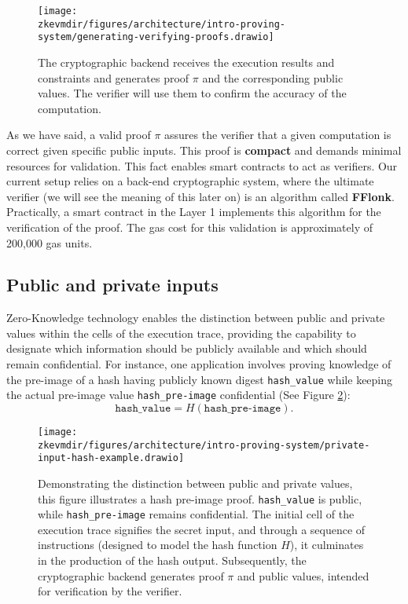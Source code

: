 \begin{figure}[h]
\centering
\texttt{[image: \\zkevmdir/figures/architecture/intro-proving-system/generating-verifying-proofs.drawio]}
\caption{The cryptographic backend receives the execution results and constraints and generates proof $\pi$ and the corresponding public values. The verifier will use them to confirm the accuracy of the computation.}
\label{fig:generating-verifying-proofs}
\end{figure}

As we have said, a valid proof $\pi$ assures the verifier that a given computation is correct given specific public inputs. This proof is \textbf{compact} and demands minimal resources for validation. This fact enables smart contracts to act as verifiers. Our current setup relies on a back-end cryptographic system, where the ultimate verifier (we will see the meaning of this later on) is an algorithm called \textbf{FFlonk}. Practically, a smart contract in the Layer 1 implements this algorithm for the verification of the proof. The gas cost for this validation is approximately of 200,000 gas units.

\subsection{Public and private inputs} \label{sec:public-private-inputs}

Zero-Knowledge technology enables the distinction between public and private values within the cells of the execution trace, providing the capability to designate which information should be publicly available and which should remain confidential. For instance, one application involves proving knowledge of the pre-image of a hash having publicly known digest \texttt{hash\_value} while keeping the actual pre-image value \texttt{hash\_pre-image} confidential (See Figure \ref{fig:private-input-hash-example}):
\[
\texttt{hash\_value} = H(\texttt{hash\_pre-image}).
\]

\begin{figure}[h]
\centering
\texttt{[image: \\zkevmdir/figures/architecture/intro-proving-system/private-input-hash-example.drawio]}
\caption{Demonstrating the distinction between public and private values, this figure illustrates a hash pre-image proof. \texttt{hash\_value} is public, while \texttt{hash\_pre-image} remains confidential. The initial cell of the execution trace signifies the secret input, and through a sequence of instructions (designed to model the hash function $H$), it culminates in the production of the hash output. Subsequently, the cryptographic backend generates proof $\pi$ and public values, intended for verification by the verifier.}
\label{fig:private-input-hash-example}
\end{figure}

